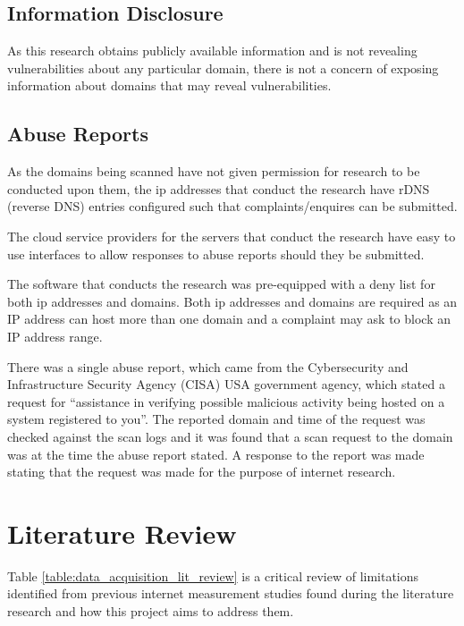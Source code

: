 \documentclass{mscreport}
\begin{document}
\subsection{Information Disclosure}

As this research obtains publicly available information and is not revealing vulnerabilities about any particular domain, there is not a concern of exposing information about domains that may reveal vulnerabilities.

\subsection{Abuse Reports}

As the domains being scanned have not given permission for research to be conducted upon them, the ip addresses that conduct the research have rDNS (reverse DNS) entries configured such that complaints/enquires can be submitted.

\vspace{0.3cm} \noindent
The cloud service providers for the servers that conduct the research have easy to use interfaces to allow responses to abuse reports should they be submitted.

\vspace{0.3cm} \noindent
The software that conducts the research was pre-equipped with a deny list for both ip addresses and domains. Both ip addresses and domains are required as an IP address can host more than one domain and a complaint may ask to block an IP address range.

\vspace{0.3cm} \noindent
There was a single abuse report, which came from the Cybersecurity and Infrastructure Security Agency (CISA) \cite{noauthor_undated-fh} USA government agency, which stated a request for ``assistance in verifying possible malicious activity being hosted on a system registered to you''. The reported domain and time of the request was checked against the scan logs and it was found that a scan request to the domain was at the time the abuse report stated. A response to the report was made stating that the request was made for the purpose of internet research.

\newpage

\section{Literature Review}
\label{section:lit_review}

Table \ref{table:data_acquisition_lit_review} is a critical review of limitations identified from previous internet measurement studies found during the literature research and how this project aims to address them.
\end{document}
